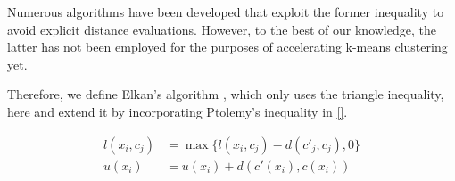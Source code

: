 Numerous algorithms have been developed that exploit the former inequality to avoid explicit distance evaluations. However, to the best of our knowledge, the latter has not been employed for the purposes of accelerating k-means clustering yet.

Therefore, we define Elkan's algorithm \cite{}, which only uses the triangle inequality, here and extend it by incorporating Ptolemy's inequality in \ref{}.


\begin{align}
  \label{eq:elkan_lower}
  l(x_i, c_j) &= \max \{ l(x_i, c_j) - d(c'_j, c_j), 0 \} \\
  \label{eq:elkan_upper}
  u(x_i) &= u(x_i) + d(c'(x_i), c(x_i))
\end{align}






